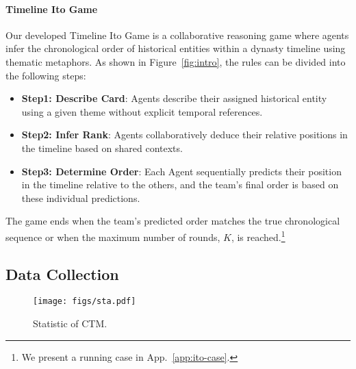 \paragraph{Timeline Ito Game}
Our developed Timeline Ito Game is a collaborative reasoning game where agents infer the chronological order of historical entities within a dynasty timeline using thematic metaphors.
As shown in Figure~\ref{fig:intro}, the rules can be divided into the following steps:
\begin{itemize}
    \item \textbf{Step1: Describe Card}: Agents describe their assigned historical entity using a given theme without explicit temporal references.
    \item \textbf{Step2: Infer Rank}: Agents collaboratively deduce their relative positions in the timeline based on shared contexts.
    \item \textbf{Step3: Determine Order}: Each Agent sequentially predicts their position in the timeline relative to the others, and the team’s final order is based on these individual predictions.
\end{itemize}
The game ends when the team’s predicted order matches the true chronological sequence or when the maximum number of rounds, $K$, is reached.\footnote{We present a running case in App.~\ref{app:ito-case}.}

\subsection{Data Collection}

\begin{figure}[t]
    \centering
    \texttt{[image: figs/sta.pdf]}
    \caption{Statistic of CTM.
    }
    \label{fig:sta}
    \vspace{-5mm}
\end{figure}

